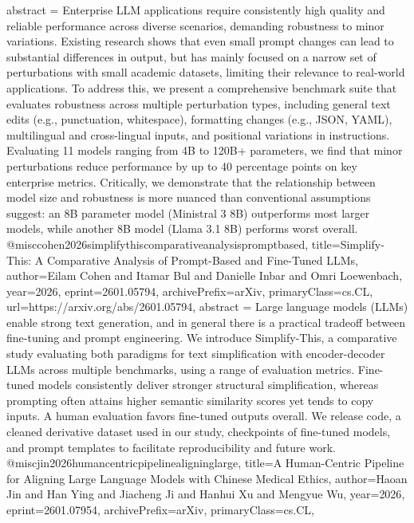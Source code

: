 {      abstract = {Enterprise LLM applications require consistently high quality and reliable performance across diverse scenarios, demanding robustness to minor variations. Existing research shows that even small prompt changes can lead to substantial differences in output, but has mainly focused on a narrow set of perturbations with small academic datasets, limiting their relevance to real-world applications. To address this, we present a comprehensive benchmark suite that evaluates robustness across multiple perturbation types, including general text edits (e.g., punctuation, whitespace), formatting changes (e.g., JSON, YAML), multilingual and cross-lingual inputs, and positional variations in instructions. Evaluating 11 models ranging from 4B to 120B+ parameters, we find that minor perturbations reduce performance by up to 40 percentage points on key enterprise metrics. Critically, we demonstrate that the relationship between model size and robustness is more nuanced than conventional assumptions suggest: an 8B parameter model (Ministral 3 8B) outperforms most larger models, while another 8B model (Llama 3.1 8B) performs worst overall.}
}@misc{cohen2026simplifythiscomparativeanalysispromptbased,
      title={Simplify-This: A Comparative Analysis of Prompt-Based and Fine-Tuned LLMs}, 
      author={Eilam Cohen and Itamar Bul and Danielle Inbar and Omri Loewenbach},
      year={2026},
      eprint={2601.05794},
      archivePrefix={arXiv},
      primaryClass={cs.CL},
      url={https://arxiv.org/abs/2601.05794},
      abstract = {Large language models (LLMs) enable strong text generation, and in general there is a practical tradeoff between fine-tuning and prompt engineering. We introduce Simplify-This, a comparative study evaluating both paradigms for text simplification with encoder-decoder LLMs across multiple benchmarks, using a range of evaluation metrics. Fine-tuned models consistently deliver stronger structural simplification, whereas prompting often attains higher semantic similarity scores yet tends to copy inputs. A human evaluation favors fine-tuned outputs overall. We release code, a cleaned derivative dataset used in our study, checkpoints of fine-tuned models, and prompt templates to facilitate reproducibility and future work.}
}@misc{jin2026humancentricpipelinealigninglarge,
      title={A Human-Centric Pipeline for Aligning Large Language Models with Chinese Medical Ethics}, 
      author={Haoan Jin and Han Ying and Jiacheng Ji and Hanhui Xu and Mengyue Wu},
      year={2026},
      eprint={2601.07954},
      archivePrefix={arXiv},
      primaryClass={cs.CL},
}
